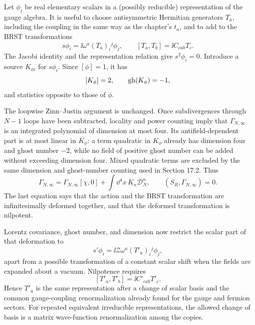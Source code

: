\ExerciseEditorialNote

\begin{enumerate}
  Let \(\phi_i\) be real elementary scalars in a (possibly reducible)
  representation of the gauge algebra.  It is useful to choose
  antisymmetric Hermitian generators \(T_a\), including the coupling
  in the same way as the chapter's \(t_a\), and to add to the BRST
  transformations
  \[
    s\phi_i=\ii\omega^a(T_a)_i{}^j\phi_j,\qquad
    [T_a,T_b]
      =\ii C_{cab}T_c .
  \]
  The Jacobi identity and the representation relation give
  \(s^2\phi_i=0\).  Introduce a source \(K_{\phi i}\) for \(s\phi_i\).
  Since \([\phi]=1\), it has
  \[
    [K_{\phi}]=2,\qquad
    {\rm gh}(K_{\phi})=-1,
  \]
  and statistics opposite to those of \(\phi\).

  The loopwise Zinn--Justin argument is unchanged.  Once subdivergences
  through \(N-1\) loops have been subtracted, locality and power counting
  imply that \(\Gamma_{N,\infty}\) is an integrated polynomial of
  dimension at most four.  Its antifield-dependent part is at most linear
  in \(K_\phi\): a term quadratic in \(K_\phi\) already has dimension four
  and ghost number \(-2\), while no field of positive ghost number can be
  added without exceeding dimension four.  Mixed quadratic terms are
  excluded by the same dimension and ghost-number counting used in
  Section 17.2.  Thus
  \[
    \Gamma_{N,\infty}
      =\Gamma_{N,\infty}[\chi,0]
       +\int \dd^4x\,K_n\mathcal D_N^n ,
    \qquad
    (S_R,\Gamma_{N,\infty})=0 .
  \]
  The last equation says that the action and the BRST transformation are
  infinitesimally deformed together, and that the deformed transformation
  is nilpotent.

  Lorentz covariance, ghost number, and dimension now restrict the scalar
  part of that deformation to
  \[
    s'\phi_i=\ii\mathcal Z\omega^a
       (T'_a)_i{}^j\phi_j ,
  \]
  apart from a possible transformation of a constant scalar shift when
  the fields are expanded about a vacuum.  Nilpotence requires
  \[
    [T'_a,T'_b]
       =\ii C'_{cab}T'_c .
  \]
  Hence \(T'_a\) is the same representation after a change of scalar
  basis and the common gauge-coupling renormalization already found for
  the gauge and fermion sectors.  For repeated equivalent irreducible
  representations, the allowed change of basis is a matrix wave-function
  renormalization among the copies.


\end{enumerate}
